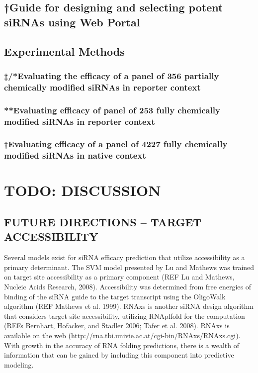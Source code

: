 \documentclass{report}
\begin{document}
\section{†Guide for designing and selecting potent siRNAs using Web Portal}



\section{Experimental Methods}

\subsection{‡/*Evaluating the efficacy of a panel of 356 partially chemically modified siRNAs in reporter context}

\subsection{**Evaluating efficacy of panel of 253 fully chemically modified siRNAs in reporter context}

\subsection{†Evaluating efficacy of a panel of 4227 fully chemically modified siRNAs in native context}





\chapter{TODO: DISCUSSION}\label{sec:discussion}

\section{FUTURE DIRECTIONS – TARGET ACCESSIBILITY}

Several models exist for siRNA efficacy prediction that utilize accessibility as a primary determinant. The SVM model presented by Lu and Mathews was trained on target site accessibility as a primary component (REF  Lu and Mathews, Nucleic Acids Research, 2008).  Accessibility was determined from free energies of binding of the siRNA guide to the target transcript using the OligoWalk algorithm (REF Mathews et al. 1999).  RNAxs is another siRNA design algorithm that considers target site accessibility, utilizing RNAplfold for the computation (REFs Bernhart, Hofacker, and Stadler 2006; Tafer et al. 2008). RNAxs is available on the web (http://rna.tbi.univie.ac.at/cgi-bin/RNAxs/RNAxs.cgi). With growth in the accuracy of RNA folding predictions, there is a wealth of information that can be gained by including this component into predictive modeling.
\end{document}
